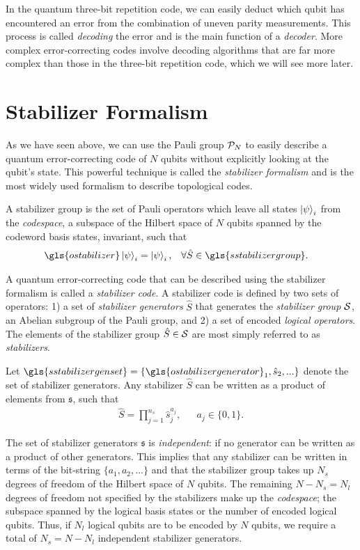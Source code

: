 In the quantum three-bit repetition code, we can easily deduct which qubit has encountered an error from the combination of uneven parity measurements. This process is called \emph{decoding} the error and is the main function of a \emph{decoder}. More complex error-correcting codes involve decoding algorithms that are far more complex than those in the three-bit repetition code, which we will see more later.


\section{Stabilizer Formalism}\label{sec:stabilizerformalism}

As we have seen above, we can use the Pauli group $\mathcal{P}_N$ to easily describe a quantum error-correcting code of $N$ qubits without explicitly looking at the qubit's state. This powerful technique is called the \emph{stabilizer formalism} \cite{gottesman1997stabilizer} and is the most widely used formalism to describe topological codes.

\begin{definition}\label{def:stabilizer}
  A stabilizer group is the set of Pauli operators which leave all states $\ket{\psi}_i$ from the \emph{codespace}, a subspace of the Hilbert space of $N$ qubits spanned by the codeword basis states, invariant, such that
\begin{align}
  & \gls{ostabilizer}\ket{\psi}_i = \ket{\psi}_i, && \forall \hat{S} \in \gls{sstabilizergroup}. &
\end{align}
\end{definition}
A quantum error-correcting code that can be described using the stabilizer formalism is called a \emph{stabilizer code}. A stabilizer code is defined by two sets of operators: 1) a set of \emph{stabilizer generators} $\hat{S}$ that generates the \emph{stabilizer group} $\mathcal{S}$, an Abelian subgroup of the Pauli group, and 2) a set of encoded \emph{logical operators}. The elements of the stabilizer group $\hat{S}\in\mathcal{S}$ are most simply referred to as \emph{stabilizers}. 
\begin{definition}\label{def:stabilizergen}
  Let $\gls{sstabilizergenset}=\{\gls{ostabilizergenerator}_1,\hat{s}_2,...\}$ denote the set of stabilizer generators. Any stabilizer $\hat{S}$ can be written as a product of elements from $\mathfrak{s}$, such that 
  \begin{align}
  & \hat{S} = \prod_{j=1}^{n_s}\hat{s}_j^{a_j}, && a_j \in \{0, 1\}. &
  \end{align}
\end{definition}
The set of stabilizer generators $\mathfrak{s}$ is \emph{independent}: if no generator can be written as a product of other generators. This implies that any stabilizer can be written in terms of the bit-string $\{a_1, a_2, ...\}$ and that the stabilizer group takes up $N_s$ degrees of freedom of the Hilbert space of $N$ qubits. The remaining $N-N_s = N_l$ degrees of freedom not specified by the stabilizers make up the \emph{codespace}; the subspace spanned by the logical basis states or the number of encoded logical qubits. Thus, if $N_l$ logical qubits are to be encoded by $N$ qubits, we require a total of $N_s= N-N_l$ independent stabilizer generators.


